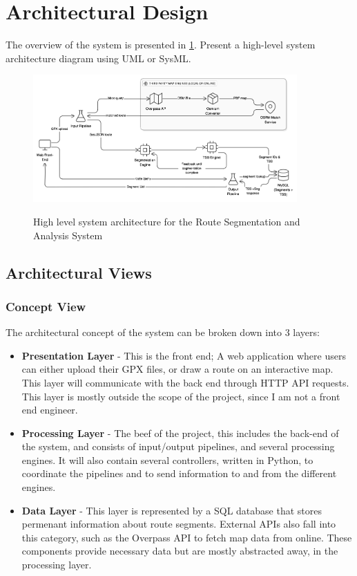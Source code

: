 \documentclass[11pt,a4paper]{report}
\begin{document}
\section{Architectural Design}
The overview of the system is presented in \ref{fig:archdiagram}.
Present a high-level system architecture diagram using UML or SysML.

\begin{figure}[h!]
	\centering
	\includegraphics[width=0.9\textwidth]{archdiagram.png}
	\label{fig:archdiagram}
	\caption {High level system architecture for the Route Segmentation and Analysis System}
\end{figure}

\subsection{Architectural Views}
\subsubsection{Concept View}
The architectural concept of the system can be broken down into 3 layers:
\begin{itemize}
	\item \textbf{Presentation Layer} - This is the front end; A web application where users can either upload their GPX
	      files, or draw a route on an interactive map. This layer will communicate with the back end through HTTP API requests. This layer is mostly
	      outside the scope of the project, since I am not a front end engineer.
	\item \textbf{Processing Layer} - The beef of the project, this includes the back-end of the system, and consists of input/output pipelines,
	      and several processing engines. It will also contain several controllers, written in Python, to coordinate the pipelines and to send
	      information to and from the different engines.
	\item \textbf{Data Layer} - This layer is represented by a SQL database that stores permenant information about route segments. External APIs also
	      fall into this category, such as the Overpass API to fetch map data from online. These components provide necessary data but are mostly abstracted
	      away, in the processing layer.
\end{itemize}
\end{document}
